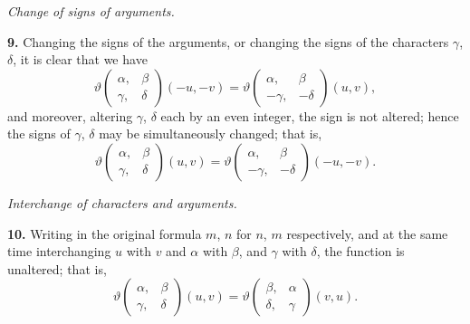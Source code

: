 \documentclass[12pt,a4paper]{article}
\theoremstyle{definition}
\begin{document}
\vspace{1em}

\begin{center}
\textit{Change of signs of arguments.}
\end{center}

\vspace{0.5em}

\noindent\textbf{9.}\quad
Changing the signs of the arguments, or changing the signs of the characters $\gamma$, $\delta$, it is clear that we have
\[
\vartheta\begin{pmatrix} \alpha, & \beta \\ \gamma, & \delta \end{pmatrix}(-u, -v) = \vartheta\begin{pmatrix} \alpha, & \beta \\ -\gamma, & -\delta \end{pmatrix}(u, v),
\]
and moreover, altering $\gamma$, $\delta$ each by an even integer, the sign is not altered; hence the signs of $\gamma$, $\delta$ may be simultaneously changed; that is,
\[
\vartheta\begin{pmatrix} \alpha, & \beta \\ \gamma, & \delta \end{pmatrix}(u, v) = \vartheta\begin{pmatrix} \alpha, & \beta \\ -\gamma, & -\delta \end{pmatrix}(-u, -v).
\]

\vspace{1em}

\begin{center}
\textit{Interchange of characters and arguments.}
\end{center}

\vspace{0.5em}

\noindent\textbf{10.}\quad
Writing in the original formula $m$, $n$ for $n$, $m$ respectively, and at the same time interchanging $u$ with $v$ and $\alpha$ with $\beta$, and $\gamma$ with $\delta$, the function is unaltered; that is,
\[
\vartheta\begin{pmatrix} \alpha, & \beta \\ \gamma, & \delta \end{pmatrix}(u, v) = \vartheta\begin{pmatrix} \beta, & \alpha \\ \delta, & \gamma \end{pmatrix}(v, u).
\]
\end{document}
